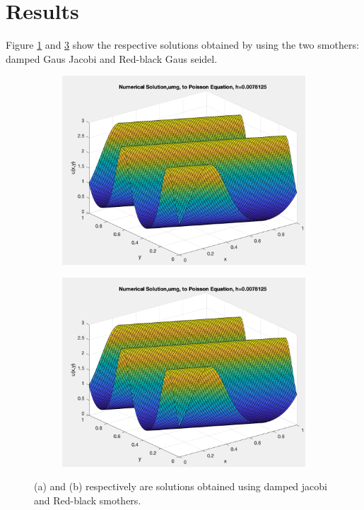 \documentclass[12pt,a4paper]{article}
\begin{document}
	\section{Results}
	Figure \ref{fig:jsoln} and \ref{fig:rdsoln} show the respective solutions obtained by using the two smothers: damped Gaus Jacobi and Red-black Gaus seidel.
	\begin{figure}[H]
		\begin{subfigure}[b]{0.5\textwidth}
			\centering
			\includegraphics[width=1.0\linewidth]{"uj"}
			\caption{}
			\label{fig:jsoln}
		\end{subfigure}
		\begin{subfigure}[b]{0.5\textwidth}
			\centering
			\includegraphics[width=1.0\linewidth]{"ur"}
			\caption{}
			\label{fig:rdsoln}
		\end{subfigure}
		\caption{(a) and (b) respectively are solutions obtained using damped jacobi and Red-black smothers. }
	\end{figure}
\end{document}
